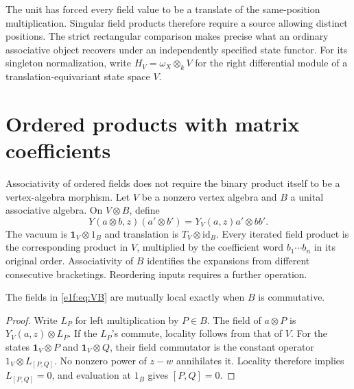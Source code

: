 The unit has forced every field value to be a translate of
the same-position multiplication. Singular field products
therefore require a source allowing distinct positions.
The strict rectangular comparison makes precise what an
ordinary associative object recovers under an independently
specified state functor. For its singleton normalization,
write \(H_V=\omega_X\otimes_kV\) for the right differential
module of a translation-equivariant state space \(V\).



\section{Ordered products with matrix coefficients}
\label{e1f:sec:ordered}

Associativity\label{e1f:def:matrix-field-inputs} of ordered fields does not require the binary
product itself to be a vertex-algebra morphism. Let \(V\)
be a nonzero vertex algebra and \(B\) a unital associative
algebra. On \(V\otimes B\), define
\begin{equation}\label{e1f:eq:VB}
 Y(a\otimes b,z)(a'\otimes b')
                 =Y_V(a,z)a'\otimes bb'.
\end{equation}
The vacuum is \(\mathbf1_V\otimes1_B\) and translation is
\(T_V\otimes\mathrm{id}_B\). Every iterated field product is the
corresponding product in \(V\), multiplied by the coefficient
word \(b_1\cdots b_n\) in its original order. Associativity
of \(B\) identifies the expansions from different consecutive
bracketings. Reordering inputs requires a further operation.

\begin{proposition}\label{e1f:prop:nonlocal}
The fields in \eqref{e1f:eq:VB} are mutually local exactly
when \(B\) is commutative.
\end{proposition}

\begin{proof}
Write\label{e1f:def:left-multiplication-operator} \(L_P\) for left multiplication by \(P\in B\).
The field of \(a\otimes P\) is \(Y_V(a,z)\otimes L_P\).
If the \(L_P\)'s commute, locality follows from that of \(V\).
For the states \(\mathbf1_V\otimes P\) and
\(\mathbf1_V\otimes Q\), their field commutator is the
constant operator \(1_V\otimes L_{[P,Q]}\). No nonzero
power of \(z-w\) annihilates it. Locality therefore implies
\(L_{[P,Q]}=0\), and evaluation at \(1_B\) gives
\([P,Q]=0\).
\end{proof}

